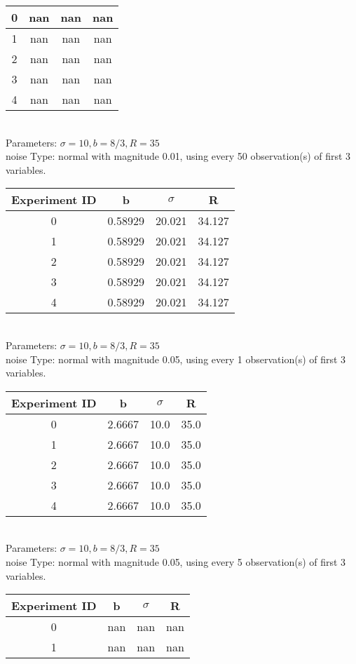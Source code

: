 \begin{multicols}{3}
\begin{tabular}{cccc}
0 & nan & nan & nan\\ \hline 
 1 & nan & nan & nan\\ \hline 
 2 & nan & nan & nan\\ \hline 
 3 & nan & nan & nan\\ \hline 
 4 & nan & nan & nan\\ \hline 
 \end{tabular}\\
Parameters: $\sigma=10, b=8/3, R=35$\\
noise Type: normal with magnitude 0.01, using every 50 observation(s) of first 3 variables.\\
\begin{tabular}{cccc}
\hline Experiment ID & b & $\sigma$ & R \\ \hline 
0 & 0.58929 & 20.021 & 34.127\\ \hline 
 1 & 0.58929 & 20.021 & 34.127\\ \hline 
 2 & 0.58929 & 20.021 & 34.127\\ \hline 
 3 & 0.58929 & 20.021 & 34.127\\ \hline 
 4 & 0.58929 & 20.021 & 34.127\\ \hline 
 \end{tabular}\\
Parameters: $\sigma=10, b=8/3, R=35$\\
noise Type: normal with magnitude 0.05, using every 1 observation(s) of first 3 variables.\\
\begin{tabular}{cccc}
\hline Experiment ID & b & $\sigma$ & R \\ \hline 
0 & 2.6667 & 10.0 & 35.0\\ \hline 
 1 & 2.6667 & 10.0 & 35.0\\ \hline 
 2 & 2.6667 & 10.0 & 35.0\\ \hline 
 3 & 2.6667 & 10.0 & 35.0\\ \hline 
 4 & 2.6667 & 10.0 & 35.0\\ \hline 
 \end{tabular}\\
Parameters: $\sigma=10, b=8/3, R=35$\\
noise Type: normal with magnitude 0.05, using every 5 observation(s) of first 3 variables.\\
\begin{tabular}{cccc}
\hline Experiment ID & b & $\sigma$ & R \\ \hline 
0 & nan & nan & nan\\ \hline 
 1 & nan & nan & nan\\ \hline 

\end{tabular}
\end{multicols}
